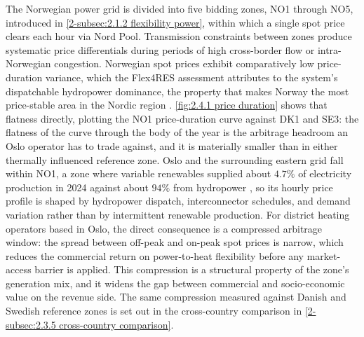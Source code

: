 The Norwegian power grid is divided into five bidding zones, NO1 through NO5, introduced in \autoref{2-subsec:2.1.2 flexibility power}, within which a single spot price clears each hour via Nord Pool. Transmission constraints between zones produce systematic price differentials during periods of high cross-border flow or intra-Norwegian congestion. Norwegian spot prices exhibit comparatively low price-duration variance, which the Flex4RES assessment attributes to the system's dispatchable hydropower dominance, the property that makes Norway the most price-stable area in the Nordic region \cite{skytte_flexible_2019}. \autoref{fig:2.4.1 price duration} shows that flatness directly, plotting the NO1 price-duration curve against DK1 and SE3: the flatness of the curve through the body of the year is the arbitrage headroom an Oslo operator has to trade against, and it is materially smaller than in either thermally influenced reference zone. Oslo and the surrounding eastern grid fall within NO1, a zone where variable renewables supplied about $4.7\%$ of electricity production in 2024 against about $94\%$ from hydropower \cite{statistisk_sentralbyra_statbank_nodate}, so its hourly price profile is shaped by hydropower dispatch, interconnector schedules, and demand variation rather than by intermittent renewable production. For district heating operators based in Oslo, the direct consequence is a compressed arbitrage window: the spread between off-peak and on-peak spot prices is narrow, which reduces the commercial return on power-to-heat flexibility before any market-access barrier is applied. This compression is a structural property of the zone's generation mix, and it widens the gap between commercial and socio-economic value on the revenue side. The same compression measured against Danish and Swedish reference zones is set out in the cross-country comparison in \autoref{2-subsec:2.3.5 cross-country comparison}.

